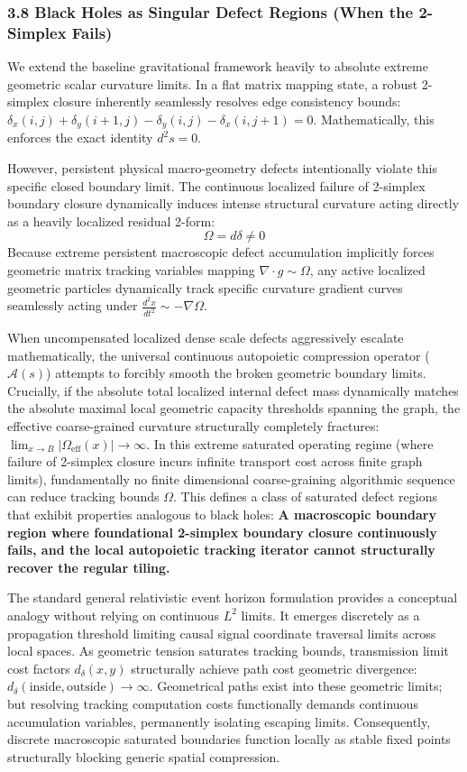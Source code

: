 \documentclass[
]{article}
\begin{document}
\subsubsection{3.8 Black Holes as Singular Defect Regions (When the
2-Simplex
Fails)}\label{black-holes-as-singular-defect-regions-when-the-2-simplex-fails}

We extend the baseline gravitational framework heavily to absolute
extreme geometric scalar curvature limits. In a flat matrix mapping
state, a robust 2-simplex closure inherently seamlessly resolves edge
consistency bounds:
\(\delta_x(i,j) + \delta_y(i+1,j) - \delta_y(i,j) - \delta_x(i,j+1) = 0\).
Mathematically, this enforces the exact identity \(d^2s = 0\).

However, persistent physical macro-geometry defects intentionally
violate this specific closed boundary limit. The continuous localized
failure of 2-simplex boundary closure dynamically induces intense
structural curvature acting directly as a heavily localized residual
2-form: \[ \Omega = d\delta \neq 0 \] Because extreme persistent
macroscopic defect accumulation implicitly forces geometric matrix
tracking variables mapping \(\nabla \cdot g \sim \Omega\), any active
localized geometric particles dynamically track specific curvature
gradient curves seamlessly acting under
\(\frac{d^2 x}{dt^2} \sim -\nabla \Omega\).

When uncompensated localized dense scale defects aggressively escalate
mathematically, the universal continuous autopoietic compression
operator (\(\mathcal{A}(s)\)) attempts to forcibly smooth the broken
geometric boundary limits. Crucially, if the absolute total localized
internal defect mass dynamically matches the absolute maximal local
geometric capacity thresholds spanning the graph, the effective
coarse-grained curvature structurally completely fractures:
\(\lim_{x \to B} |\Omega_{\text{eff}}(x)| \to \infty\). In this extreme
saturated operating regime (where failure of 2-simplex closure incurs
infinite transport cost across finite graph limits), fundamentally no
finite dimensional coarse-graining algorithmic sequence can reduce
tracking bounds \(\Omega\). This defines a class of saturated defect
regions that exhibit properties analogous to black holes: \textbf{A
macroscopic boundary region where foundational 2-simplex boundary
closure continuously fails, and the local autopoietic tracking iterator
cannot structurally recover the regular tiling.}

The standard general relativistic event horizon formulation provides a
conceptual analogy without relying on continuous \(L^2\) limits. It
emerges discretely as a propagation threshold limiting causal signal
coordinate traversal limits across local spaces. As geometric tension
saturates tracking bounds, transmission limit cost factors
\(d_\delta(x,y)\) structurally achieve path cost geometric divergence:
\(d_\delta(\text{inside}, \text{outside}) \to \infty\). Geometrical
paths exist into these geometric limits; but resolving tracking
computation costs functionally demands continuous accumulation
variables, permanently isolating escaping limits. Consequently, discrete
macroscopic saturated boundaries function locally as stable fixed points
structurally blocking generic spatial compression.
\end{document}
